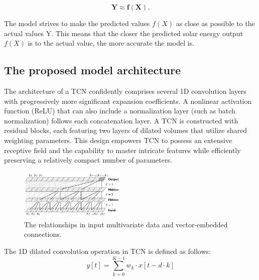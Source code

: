\documentclass[sn-mathphys-num]{sn-jnl}%
\begin{document}
\begin{equation}
\mathbf{Y} \approx \mathbf{f}(\mathbf{X}).
\end{equation}

The model strives to make the predicted values \(f(X)\) as close as possible to the actual values Y. This means that the closer the predicted solar energy output \(f(X)\) is to the actual value, the more accurate the model is. 

\subsection{The proposed model architecture}
 The architecture of a TCN confidently comprises several 1D convolution layers with progressively more significant expansion coefficients. A nonlinear activation function (ReLU) that can also include a normalization layer (such as batch normalization) follows each concatenation layer. A TCN is constructed with residual blocks, each featuring two layers of dilated volumes that utilize shared weighting parameters. This design empowers TCN to possess an extensive receptive field and the capability to master intricate features while efficiently preserving a relatively compact number of parameters.

\begin{figure}[htbp]
  \centering
  \includegraphics[width=0.45\textwidth]{tcn3d.jpg}
  \caption{The relationships in input multivariate data and vector-embedded connections.}
  \label{fig:tcn3d}
\end{figure}

The 1D dilated convolution operation in TCN is defined as follows:
\begin{equation}
y[t] = \sum_{k=0}^{K-1} w_k \cdot x[t - d \cdot k]
   \end{equation}
\end{document}
